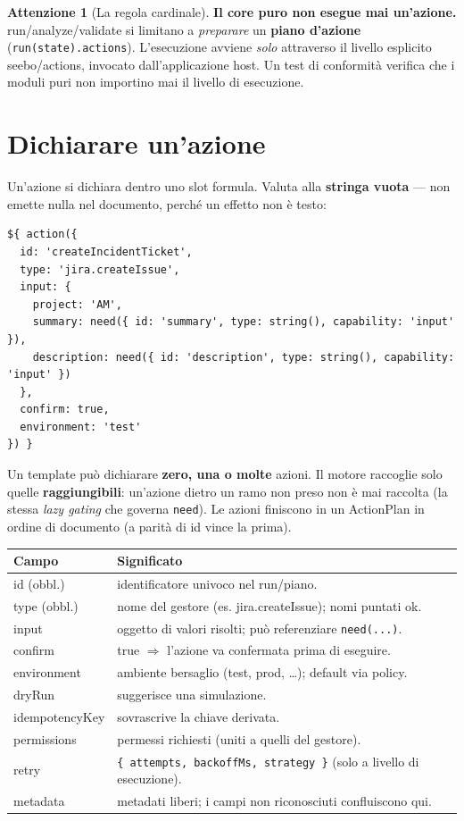 \documentclass[11pt,a4paper]{book}
\let\code\lstinline
\newcommand{\ic}[1]{{\ttfamily #1}}
\theoremstyle{definition}
\newtheorem*{attenzione}{Attenzione}
\begin{document}
{{{{\begin{attenzione}[La regola cardinale]
\textbf{Il core puro non esegue mai un'azione.} \ic{run}/\ic{analyze}/\ic{validate}
si limitano a \emph{preparare} un \textbf{piano d'azione}
(\code|run(state).actions|). L'esecuzione avviene \emph{solo} attraverso il livello
esplicito \ic{seebo/actions}, invocato dall'applicazione host. Un test di
conformità verifica che i moduli puri non importino mai il livello di esecuzione.
\end{attenzione}

\section{Dichiarare un'azione}

Un'azione si dichiara dentro uno slot formula. Valuta alla \textbf{stringa vuota}
--- non emette nulla nel documento, perché un effetto non è testo:

\begin{lstlisting}
${ action({
  id: 'createIncidentTicket',
  type: 'jira.createIssue',
  input: {
    project: 'AM',
    summary: need({ id: 'summary', type: string(), capability: 'input' }),
    description: need({ id: 'description', type: string(), capability: 'input' })
  },
  confirm: true,
  environment: 'test'
}) }
\end{lstlisting}

Un template può dichiarare \textbf{zero, una o molte} azioni. Il motore raccoglie
solo quelle \textbf{raggiungibili}: un'azione dietro un ramo non preso non è mai
raccolta (la stessa \emph{lazy gating} che governa \code|need|). Le azioni finiscono
in un \ic{ActionPlan} in ordine di documento (a parità di \ic{id} vince la prima).

\begin{center}
\small
\begin{tabular}{@{}l p{9.4cm}@{}}
\toprule
\textbf{Campo} & \textbf{Significato} \\
\midrule
\ic{id} (obbl.) & identificatore univoco nel run/piano. \\
\ic{type} (obbl.) & nome del gestore (es. \ic{jira.createIssue}); nomi puntati ok. \\
\ic{input} & oggetto di valori risolti; può referenziare \code|need(...)|. \\
\ic{confirm} & \ic{true} $\Rightarrow$ l'azione va confermata prima di eseguire. \\
\ic{environment} & ambiente bersaglio (\ic{test}, \ic{prod}, \ldots); default via policy. \\
\ic{dryRun} & suggerisce una simulazione. \\
\ic{idempotencyKey} & sovrascrive la chiave derivata. \\
\ic{permissions} & permessi richiesti (uniti a quelli del gestore). \\
\ic{retry} & \verb|{ attempts, backoffMs, strategy }| (solo a livello di esecuzione). \\
\ic{metadata} & metadati liberi; i campi non riconosciuti confluiscono qui. \\
\bottomrule
\end{tabular}
\end{center}

}}}}
\end{document}
